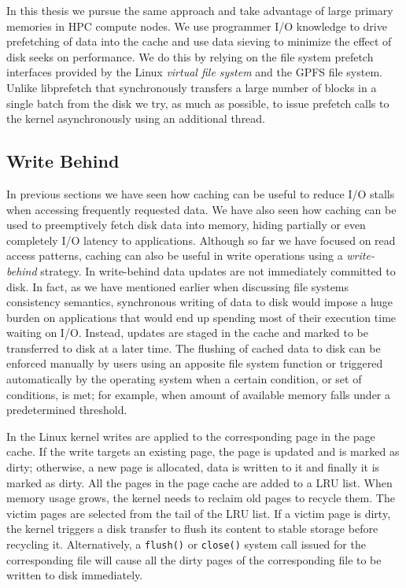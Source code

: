In this thesis we pursue the same approach and take advantage of large primary memories in HPC compute nodes. We use programmer I/O knowledge to drive prefetching of data into the cache and use data sieving to minimize the effect 
of disk seeks on performance. We do this by relying on the file system prefetch interfaces provided by the Linux \textit{virtual file system} and the GPFS file system. Unlike libprefetch that synchronously transfers a large number of 
blocks in a single batch from the disk we try, as much as possible, to issue prefetch calls to the kernel asynchronously using an additional thread. 

\subsection{Write Behind}
In previous sections we have seen how caching can be useful to reduce I/O stalls when accessing frequently requested data. We have also seen how caching can be used to preemptively fetch disk data into memory, hiding partially 
or even completely I/O latency to applications. Although so far we have focused on read access patterns, caching can also be useful in write operations using a \textit{write-behind} strategy. In write-behind data updates are not 
immediately committed to disk. In fact, as we have mentioned earlier when discussing file systems consistency semantics, synchronous writing of data to disk would impose a huge burden on applications that would end up spending 
most of their execution time waiting on I/O. Instead, updates are staged in the cache and marked to be transferred to disk at a later time. The flushing of cached data to disk can be enforced manually by users using an apposite 
file system function or triggered automatically by the operating system when a certain condition, or set of conditions, is met; for example, when amount of available memory falls under a predetermined threshold.

In the Linux kernel writes are applied to the corresponding page in the page cache. If the write targets an existing page, the page is updated and is marked as dirty; otherwise, a new page is allocated, data is written to it 
and finally it is marked as dirty. All the pages in the page cache are added to a LRU list. When memory usage grows, the kernel needs to reclaim old pages to recycle them. The victim pages are selected from the tail of the 
LRU list. If a victim page is dirty, the kernel triggers a disk transfer to flush its content to stable storage before recycling it. Alternatively, a \texttt{flush()} or \texttt{close()} system call issued for the corresponding 
file will cause all the dirty pages of the corresponding file to be written to disk immediately.

